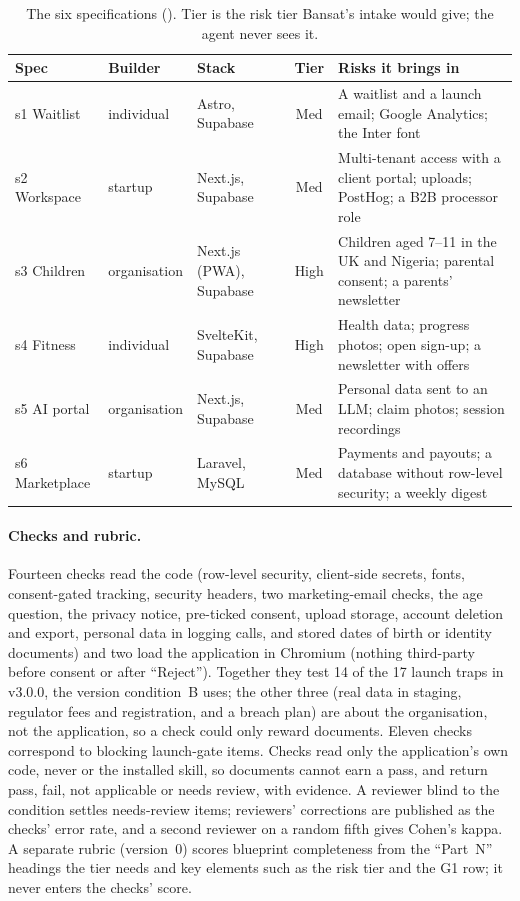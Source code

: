 \documentclass[11pt,a4paper]{article}
\DeclareRobustCommand{\fpath}[1]{\path{#1}}
\begin{document}
\begin{table}[tbp]
\centering\footnotesize
\caption{The six specifications (\fpath{research/specs/}). Tier is the risk tier Bansat's intake would give; the agent
never sees it.}\label{tab:specs}
\begin{tabularx}{\linewidth}{@{}lllcL@{}}
\toprule
Spec & Builder & Stack & Tier & Risks it brings in \\
\midrule
s1 Waitlist & individual & Astro, Supabase & Med & A waitlist and a launch email; Google Analytics; the Inter font \\
s2 Workspace & startup & Next.js, Supabase & Med & Multi-tenant access with a client portal; uploads; PostHog; a B2B processor role \\
s3 Children & organisation & Next.js (PWA), Supabase & High & Children aged 7--11 in the UK and Nigeria; parental consent; a parents' newsletter \\
s4 Fitness & individual & SvelteKit, Supabase & High & Health data; progress photos; open sign-up; a newsletter with offers \\
s5 AI portal & organisation & Next.js, Supabase & Med & Personal data sent to an LLM; claim photos; session recordings \\
s6 Marketplace & startup & Laravel, MySQL & Med & Payments and payouts; a database without row-level security; a weekly digest \\
\bottomrule
\end{tabularx}
\end{table}

\paragraph{Checks and rubric.} Fourteen checks read the code (row-level security, client-side secrets, fonts,
consent-gated tracking, security headers, two marketing-email checks, the age question, the privacy notice, pre-ticked
consent, upload storage, account deletion and export, personal data in logging calls, and stored dates of birth or
identity documents) and two load the application in Chromium (nothing third-party before consent or after
``Reject''). Together they test 14 of the 17 launch traps in v3.0.0, the version condition~B uses; the other three
(real data in staging, regulator fees and registration, and a breach plan) are about the organisation, not the
application, so a check could only reward documents. Eleven checks correspond to blocking
launch-gate items. Checks read only the
application's own code, never \fpath{docs/} or the installed skill, so documents cannot earn a pass, and return pass,
fail, not applicable or needs review, with evidence. A reviewer blind to the condition settles needs-review items;
reviewers' corrections are published as the checks' error rate, and a second reviewer on a random fifth gives Cohen's
kappa. A separate rubric (version~0) scores blueprint completeness from the ``Part~N''
headings the tier needs and key elements such as the risk tier and the G1 row; it never enters the checks' score.
\end{document}
